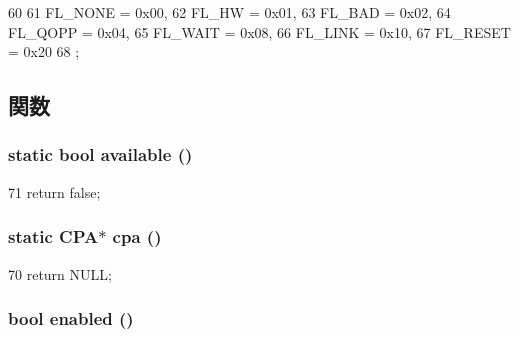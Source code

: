 \begin{DoxyCode}
60                {
61         FL_NONE     = 0x00,
62         FL_HW       = 0x01,
63         FL_BAD      = 0x02,
64         FL_QOPP     = 0x04,
65         FL_WAIT     = 0x08,
66         FL_LINK     = 0x10,
67         FL_RESET    = 0x20
68     };
\end{DoxyCode}


\subsection{関数}
\hypertarget{classCPA_a98100f2f476b294d430b1a66c9039da1}{
\subsubsection[{available}]{\setlength{\rightskip}{0pt plus 5cm}static bool available ()}}
\label{classCPA_a98100f2f476b294d430b1a66c9039da1}



\begin{DoxyCode}
71 { return false; }
\end{DoxyCode}
\hypertarget{classCPA_af57eb8a9bcb0a342b03eaa0bc6255684}{
\subsubsection[{cpa}]{\setlength{\rightskip}{0pt plus 5cm}static {\bf CPA}$\ast$ cpa ()}}
\label{classCPA_af57eb8a9bcb0a342b03eaa0bc6255684}



\begin{DoxyCode}
70 { return NULL; }
\end{DoxyCode}
\hypertarget{classCPA_acafb7271189f6d844921794d61cd608a}{
\subsubsection[{enabled}]{\setlength{\rightskip}{0pt plus 5cm}bool enabled ()}}
\label{classCPA_acafb7271189f6d844921794d61cd608a}




